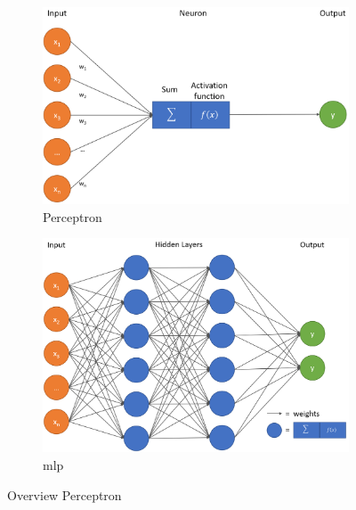 \begin{figure}[t]
  \hspace*{-0.8cm}
  \centering
  \begin{subfigure}{0.65\textwidth}
    \centering
    \includegraphics[width=\linewidth]{images/perceptron.png}
    \caption[Perceptron]{Perceptron} \label{fig:perceptron}
  \end{subfigure}

  \vspace{0.5cm}

  \begin{subfigure}{0.7\textwidth}
    \centering
    \includegraphics[width=\linewidth]{images/mlp.png}
    \caption[Multilayer Perceptron]{\acrfull{mlp}} \label{fig:mlp}
  \end{subfigure}

\caption[Overview Perceptron]{Overview Perceptron} \label{fig:NN_Overview}
\end{figure}

